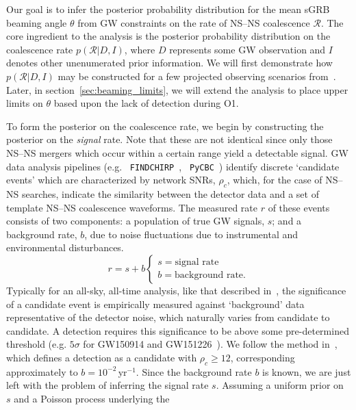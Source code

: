 \documentclass[twocolumn,nofootinbib]{revtex4-1}
\newcommand{\cbcrate}{{{\mathcal R}}}
\newcommand{\BNS}{\ac{NS}--\ac{NS}\xspace}
\begin{document}
Our goal is to infer the posterior probability distribution for the mean
\ac{sGRB} beaming angle $\theta$ from \ac{GW} constraints on the rate of \BNS
coalescence $\cbcrate$.  The core ingredient to the analysis is the posterior
probability distribution on the coalescence rate $p(\cbcrate|D,I)$, where $D$
represents some \ac{GW} observation and $I$ denotes other unenumerated prior
information.  We will first demonstrate how $p(\cbcrate|D,I)$ may be constructed
for a few projected observing scenarios from~\cite{Aasi:2013wya}.  Later, in
section~\ref{sec:beaming_limits}, we will extend the analysis to place upper
limits on $\theta$ based upon the lack of detection during O1.

To form the posterior on the coalescence rate, we begin by constructing the
posterior on the \emph{signal} rate.  Note that these are not identical since
only those \BNS mergers which occur within a certain range yield a detectable
signal.  \ac{GW} data analysis pipelines (e.g. {\tt
FINDCHIRP}~\cite{2012PhRvD..85l2006A}, {\tt
PyCBC}~\cite{Canton:2014ena,Usman:2015kfa,alex_nitz_2017_844934}) identify
discrete `candidate events' which are characterized by network \acp{SNR},
$\rho_c$, which, for the case of \BNS searches, indicate the similarity between
the detector data and a set of template \BNS coalescence waveforms.  The
measured rate $r$ of these events consists of two components: a population of
true \ac{GW} signals, $s$; and a background rate, $b$, due to noise fluctuations
due to instrumental and environmental disturbances.
%
\begin{equation}
r = s + b
\begin{cases}
s = \text{signal rate} \\
b = \text{background rate}.
\end{cases}
\end{equation}
%
Typically for an all-sky, all-time analysis, like that described
in~\cite{Usman:2015kfa}, the significance of a candidate event is
empirically measured against `background' data representative of the
detector noise, which naturally varies from candidate to candidate.  A
detection requires this significance to be above some pre-determined
threshold (e.g. $5\sigma$ for GW150914 and
GW151226~\cite{Abbott:2016blz,Abbott:2016nmj}).  We follow the method
in~\cite{Aasi:2013wya}, which defines a detection as a candidate with
$\rho_c \geq 12$, corresponding approximately to
$b=10^{-2}$\,yr$^{-1}$.  Since the background rate $b$ is known, we
are just left with the problem of inferring the signal rate $s$.
Assuming a uniform prior on $s$ and a Poisson process underlying the
\end{document}

